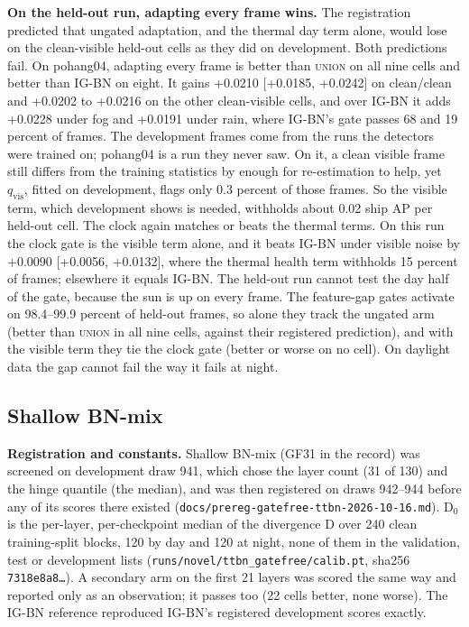\documentclass[journal,onecolumn]{IEEEtran}
\begin{document}
\textbf{On the held-out run, adapting every frame wins.} The registration predicted that ungated adaptation, and the thermal day term alone, would lose on the clean-visible held-out cells as they did on development. Both predictions fail. On pohang04, adapting every frame is better than \textsc{union} on all nine cells and better than \mbox{IG-BN} on eight. It gains +0.0210 [+0.0185, +0.0242] on clean/clean and +0.0202 to +0.0216 on the other clean-visible cells, and over \mbox{IG-BN} it adds +0.0228 under fog and +0.0191 under rain, where \mbox{IG-BN}'s gate passes 68 and 19 percent of frames. The development frames come from the runs the detectors were trained on; pohang04 is a run they never saw. On it, a clean visible frame still differs from the training statistics by enough for re-estimation to help, yet $q_{\mathrm{vis}}$, fitted on development, flags only 0.3 percent of those frames. So the visible term, which development shows is needed, withholds about 0.02 ship AP per held-out cell. The clock again matches or beats the thermal terms. On this run the clock gate is the visible term alone, and it beats \mbox{IG-BN} under visible noise by +0.0090 [+0.0056, +0.0132], where the thermal health term withholds 15 percent of frames; elsewhere it equals \mbox{IG-BN}. The held-out run cannot test the day half of the gate, because the sun is up on every frame. The feature-gap gates activate on 98.4--99.9 percent of held-out frames, so alone they track the ungated arm (better than \textsc{union} in all nine cells, against their registered prediction), and with the visible term they tie the clock gate (better or worse on no cell). On daylight data the gap cannot fail the way it fails at night.

\subsection{Shallow BN-mix}\label{app:G.6}
\textbf{Registration and constants.} Shallow BN-mix (GF31 in the record) was screened on development draw 941, which chose the layer count (31 of 130) and the hinge quantile (the median), and was then registered on draws 942--944 before any of its scores there existed (\texttt{docs/\allowbreak{}prereg-\allowbreak{}gatefree-\allowbreak{}ttbn-\allowbreak{}2026-\allowbreak{}10-\allowbreak{}16.md}). D$_{0}$ is the per-layer, per-checkpoint median of the divergence D over 240 clean training-split blocks, 120 by day and 120 at night, none of them in the validation, test or development lists (\texttt{runs/\allowbreak{}novel/\allowbreak{}ttbn\_\allowbreak{}gatefree/\allowbreak{}calib.pt}, sha256 \texttt{7318e8a8…}). A secondary arm on the first 21 layers was scored the same way and reported only as an observation; it passes too (22 cells better, none worse). The \mbox{IG-BN} reference reproduced \mbox{IG-BN}'s registered development scores exactly.
\end{document}
